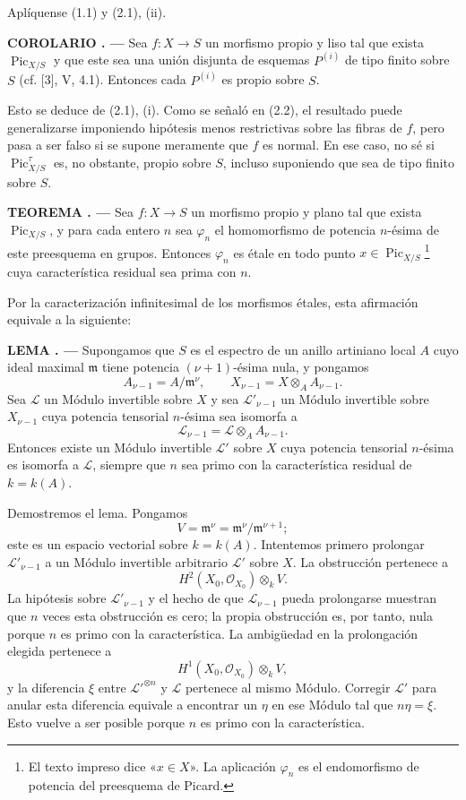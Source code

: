 \documentclass[11pt,twoside,openany]{book}
\numberwithin{equation}{section}
\newcommand{\src}[1]{%
  \phantomsection\hypertarget{src:#1}{}%
  \marginpar{\raggedleft\footnotesize\sffamily #1}%
}
\theoremstyle{plain}
\theoremstyle{definition}
\theoremstyle{remark}
\newcommand{\result}[2]{%
  \par\medskip\noindent\textbf{#1%
  \if\relax\detokenize{#2}\relax\else\space#2\fi. ---}\enspace
}
\newcommand{\FgaUnitKey}{frontmatter}
\renewcommand{\src}[1]{%
  \phantomsection\hypertarget{src:\FgaUnitKey:#1}{}%
  \marginpar{\raggedleft\footnotesize\sffamily #1}%
}
\theoremstyle{plain}
\theoremstyle{definition}
\theoremstyle{remark}
\begin{document}
Aplíquense (1.1) y (2.1), (ii).

\result{COROLARIO}{2.4} Sea $f:X\longrightarrow S$ un morfismo propio y liso
tal que exista $\operatorname{Pic}_{X/S}$ y que este sea una unión disjunta de
esquemas $P^{(i)}$ de tipo finito sobre $S$ (cf. [3], V, 4.1). Entonces cada
$P^{(i)}$ es propio sobre $S$.

Esto se deduce de (2.1), (i). Como se señaló en (2.2), el resultado puede
generalizarse imponiendo hipótesis menos restrictivas sobre las fibras de $f$,
pero pasa a ser falso si se supone meramente que $f$ es normal. En ese caso,
no sé si $\operatorname{Pic}_{X/S}^\tau$ es, no obstante, propio sobre $S$,
incluso suponiendo que sea de tipo finito sobre $S$.

\src{233}
\result{TEOREMA}{2.5} Sea $f:X\longrightarrow S$ un morfismo propio y plano tal
que exista $\operatorname{Pic}_{X/S}$, y para cada entero $n$ sea $\varphi_n$
el homomorfismo de potencia $n$-ésima de este preesquema en grupos. Entonces
$\varphi_n$ es étale en todo punto
$x\in\operatorname{Pic}_{X/S}$\footnote{El texto impreso dice «$x\in X$». La
aplicación $\varphi_n$ es el endomorfismo de potencia del preesquema de
Picard.} cuya característica residual sea prima con $n$.

Por la caracterización infinitesimal de los morfismos étales, esta afirmación
equivale a la siguiente:

\result{LEMA}{2.6} Supongamos que $S$ es el espectro de un anillo artiniano
local $A$ cuyo ideal maximal $\mathfrak m$ tiene potencia $(\nu+1)$-ésima nula,
y pongamos
\[
A_{\nu-1}=A/\mathfrak m^\nu,
\qquad X_{\nu-1}=X\otimes_A A_{\nu-1}.
\]
Sea $\mathcal L$ un Módulo invertible sobre $X$ y sea
$\mathcal L'_{\nu-1}$ un Módulo invertible sobre $X_{\nu-1}$ cuya potencia
tensorial $n$-ésima sea isomorfa a
\[
\mathcal L_{\nu-1}=\mathcal L\otimes_A A_{\nu-1}.
\]
Entonces existe un Módulo invertible $\mathcal L'$ sobre $X$ cuya potencia
tensorial $n$-ésima es isomorfa a $\mathcal L$, siempre que $n$ sea primo con
la característica residual de $k=k(A)$.

Demostremos el lema. Pongamos
\[
V=\mathfrak m^\nu=\mathfrak m^\nu/\mathfrak m^{\nu+1};
\]
este es un espacio vectorial sobre $k=k(A)$. Intentemos primero prolongar
$\mathcal L'_{\nu-1}$ a un Módulo invertible arbitrario $\mathcal L'$ sobre $X$.
La obstrucción pertenece a
\[
H^2(X_0,\mathcal O_{X_0})\otimes_k V.
\]
La hipótesis sobre $\mathcal L'_{\nu-1}$ y el hecho de que
$\mathcal L_{\nu-1}$ pueda prolongarse muestran que $n$ veces esta obstrucción
es cero; la propia obstrucción es, por tanto, nula porque $n$ es primo con la
característica. La ambigüedad en la prolongación elegida pertenece a
\[
H^1(X_0,\mathcal O_{X_0})\otimes_k V,
\]
y la diferencia $\xi$ entre $\mathcal L'^{\otimes n}$ y $\mathcal L$ pertenece
al mismo Módulo. Corregir $\mathcal L'$ para anular esta diferencia equivale a
encontrar un $\eta$ en ese Módulo tal que $n\eta=\xi$. Esto vuelve a ser
posible porque $n$ es primo con la característica.
\end{document}
